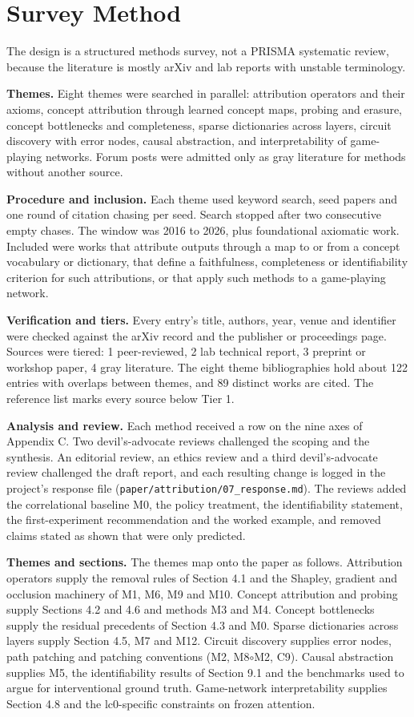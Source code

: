 \documentclass[conference]{IEEEtran}
\begin{document}
\section{Survey Method}\label{app:E}
The design is a structured methods survey, not a PRISMA systematic review, because the literature is mostly arXiv and lab reports with unstable terminology.

\textbf{Themes.} Eight themes were searched in parallel: attribution operators and their axioms, concept attribution through learned concept maps, probing and erasure, concept bottlenecks and completeness, sparse dictionaries across layers, circuit discovery with error nodes, causal abstraction, and interpretability of game-playing networks. Forum posts were admitted only as gray literature for methods without another source.

\textbf{Procedure and inclusion.} Each theme used keyword search, seed papers and one round of citation chasing per seed. Search stopped after two consecutive empty chases. The window was 2016 to 2026, plus foundational axiomatic work. Included were works that attribute outputs through a map to or from a concept vocabulary or dictionary, that define a faithfulness, completeness or identifiability criterion for such attributions, or that apply such methods to a game-playing network.

\textbf{Verification and tiers.} Every entry's title, authors, year, venue and identifier were checked against the arXiv record and the publisher or proceedings page. Sources were tiered: 1 peer-reviewed, 2 lab technical report, 3 preprint or workshop paper, 4 gray literature. The eight theme bibliographies hold about 122 entries with overlaps between themes, and 89 distinct works are cited. The reference list marks every source below Tier 1.

\textbf{Analysis and review.} Each method received a row on the nine axes of Appendix C. Two devil's-advocate reviews challenged the scoping and the synthesis. An editorial review, an ethics review and a third devil's-advocate review challenged the draft report, and each resulting change is logged in the project's response file (\texttt{paper/\allowbreak{}attribution/\allowbreak{}07\_\allowbreak{}response.\allowbreak{}md}). The reviews added the correlational baseline M0, the policy treatment, the identifiability statement, the first-experiment recommendation and the worked example, and removed claims stated as shown that were only predicted.

\textbf{Themes and sections.} The themes map onto the paper as follows. Attribution operators supply the removal rules of Section 4.1 and the Shapley, gradient and occlusion machinery of M1, M6, M9 and M10. Concept attribution and probing supply Sections 4.2 and 4.6 and methods M3 and M4. Concept bottlenecks supply the residual precedents of Section 4.3 and M0. Sparse dictionaries across layers supply Section 4.5, M7 and M12. Circuit discovery supplies error nodes, path patching and patching conventions (M2, M8$\circ$M2, C9). Causal abstraction supplies M5, the identifiability results of Section 9.1 and the benchmarks used to argue for interventional ground truth. Game-network interpretability supplies Section 4.8 and the lc0-specific constraints on frozen attention.
\end{document}
